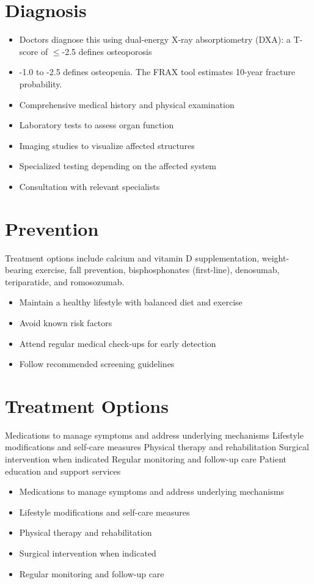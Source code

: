 \section{Diagnosis}
\begin{itemize}[noitemsep]
  \item Doctors diagnose this using dual-energy X-ray absorptiometry (DXA): a T-score of $\leq$-2.5 defines osteoporosis
  \item -1.0 to -2.5 defines osteopenia. The FRAX tool estimates 10-year fracture probability.
  \item Comprehensive medical history and physical examination
  \item Laboratory tests to assess organ function
  \item Imaging studies to visualize affected structures
  \item Specialized testing depending on the affected system
  \item Consultation with relevant specialists
\end{itemize}
\section{Prevention}
Treatment options include calcium and vitamin D supplementation, weight-bearing exercise, fall prevention, bisphosphonates (first-line), denosumab, teriparatide, and romosozumab.

\begin{itemize}[noitemsep]
  \item Maintain a healthy lifestyle with balanced diet and exercise
  \item Avoid known risk factors
  \item Attend regular medical check-ups for early detection
  \item Follow recommended screening guidelines
\end{itemize}
\section{Treatment Options}
Medications to manage symptoms and address underlying mechanisms Lifestyle modifications and self-care measures Physical therapy and rehabilitation Surgical intervention when indicated Regular monitoring and follow-up care Patient education and support services

\begin{itemize}[noitemsep]
  \item Medications to manage symptoms and address underlying mechanisms
  \item Lifestyle modifications and self-care measures
  \item Physical therapy and rehabilitation
  \item Surgical intervention when indicated
  \item Regular monitoring and follow-up care
\end{itemize}
